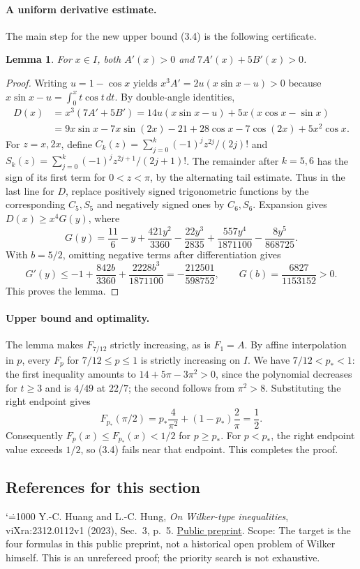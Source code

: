 \documentclass[11pt,a4paper]{article}
\makeatletter
\numberwithin{equation}{section}
\newtheorem{lemma}[theorem]{Lemma}
\theoremstyle{definition}
\theoremstyle{remark}
\renewenvironment{thebibliography}[1]
 {\subsection*{References for this section}\small
  \list{\@biblabel{\@arabic\c@enumiv}}
       {\settowidth\labelwidth{\@biblabel{#1}}\leftmargin\labelwidth
        \advance\leftmargin\labelsep\@openbib@code
        \usecounter{enumiv}\let\p@enumiv\@empty
        \renewcommand\theenumiv{\@arabic\c@enumiv}}
  \sloppy\clubpenalty4000\widowpenalty4000\sfcode`\.=1000\relax}
 {\def\@noitemerr{\@latex@warning{Empty bibliography}}\endlist}
\makeatother
\begin{document}
\paragraph{A uniform derivative estimate.}
The main step for the new upper bound (3.4) is the following certificate.
\begin{lemma}
For $x\in I$, both $A'(x)>0$ and $7A'(x)+5B'(x)>0$.
\end{lemma}
\begin{proof}
Writing $u=1-\cos x$ yields $x^3 A'=2u(x\sin x-u)>0$ because $x\sin x-u=\int_0^xt\cos t\,dt$. By double-angle identities,
\begin{align*}
 D(x)&=x^3(7A'+5B')=14u(x\sin x-u)+5x(x\cos x-\sin x)\\
 &=9x\sin x-7x\sin(2x)-21+28\cos x-7\cos(2x)+5x^2\cos x .
\end{align*}
For $z=x,2x$, define $C_k(z)=\sum_{j=0}^k(-1)^j z^{2j}/(2j)!$ and
$S_k(z)=\sum_{j=0}^k(-1)^j z^{2j+1}/(2j+1)!$.
The remainder after $k=5,6$ has the sign of its first term for $0<z<\pi$, by the alternating tail estimate. Thus in the last line for $D$, replace positively signed trigonometric functions by the corresponding $C_5,S_5$ and negatively signed ones by $C_6,S_6$. Expansion gives $D(x)\ge x^4 G(y)$, where
\[
 G(y)=\frac{11}{6}-y+\frac{421 y^2}{3360}-\frac{22 y^3}{2835}
      +\frac{557 y^4}{1871100}-\frac{8y^5}{868725}.
\]
With $b=5/2$, omitting negative terms after differentiation gives
\[
 G'(y)\le-1+\frac{842b}{3360}+\frac{2228b^3}{1871100}
 =-\frac{212501}{598752},\qquad G(b)=\frac{6827}{1153152}>0.
\]
This proves the lemma.
\end{proof}

\paragraph{Upper bound and optimality.}
The lemma makes $F_{7/12}$ strictly increasing, as is $F_1=A$. By affine interpolation in $p$, every $F_p$ for $7/12\le p\le1$ is strictly increasing on $I$. We have $7/12<p_*<1$: the first inequality amounts to $14+5\pi-3\pi^2>0$, since the polynomial decreases for $t\ge3$ and is $4/49$ at $22/7$; the second follows from $\pi^2>8$. Substituting the right endpoint gives
\[
 F_{p_*}(\pi/2)=p_*\frac{4}{\pi^2}+(1-p_*)\frac{2}{\pi}=\frac12.
\]
Consequently $F_p(x)\le F_{p_*}(x)<1/2$ for $p\ge p_*$. For $p<p_*$, the right endpoint value exceeds $1/2$, so (3.4) fails near that endpoint. This completes the proof.

\begin{thebibliography}{1}
 Y.-C. Huang and L.-C. Hung, \emph{On Wilker-type inequalities},
viXra:2312.0112v1 (2023), Sec.~3, p.~5.
\href{https://vixra.org/pdf/2312.0112v1.pdf}{Public preprint}.
\end{thebibliography}
\noindent\small Scope: The target is the four formulas in this public preprint, not a historical open problem of Wilker himself. This is an unrefereed proof; the priority search is not exhaustive.
\end{document}
